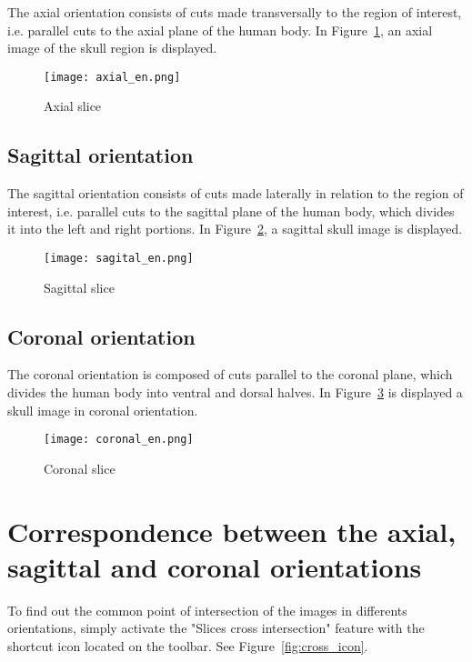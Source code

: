 The axial orientation consists of cuts made transversally to the region of interest, i.e. parallel cuts to the axial plane of the human body.
In Figure~\ref{fig:axial_corte}, an axial image of the skull region is displayed.

\begin{figure}[!htb]
\centering
\texttt{[image: axial\_en.png]}
\caption{Axial slice}
\label{fig:axial_corte}
\end{figure}

\subsection{Sagittal orientation}

The sagittal orientation consists of cuts made laterally in relation to the region of interest, i.e. parallel cuts to the sagittal plane of the human body, which divides it into the left and right portions.
In Figure~\ref{fig:sagital_slice}, a sagittal skull image is displayed.

\begin{figure}[!htb]
\centering
\texttt{[image: sagital\_en.png]}
\caption{Sagittal slice}
\label{fig:sagital_slice}
\end{figure}

\newpage

\subsection{Coronal orientation}

The coronal orientation is composed of cuts parallel to the coronal plane, which divides the human body into ventral and dorsal halves.
In Figure~\ref{fig:coronal_slice} is displayed a skull image in coronal orientation.

\begin{figure}[!htb]
\centering
\texttt{[image: coronal\_en.png]}
\caption{Coronal slice}
\label{fig:coronal_slice}
\end{figure}


\section{Correspondence between the axial, sagittal and coronal orientations}
\label{sec:corresp_all_orient}

To find out the common point of intersection of the images in differents orientations, simply activate the "Slices cross intersection" feature with the shortcut icon located on the toolbar. See Figure~\ref{fig:cross_icon}.

